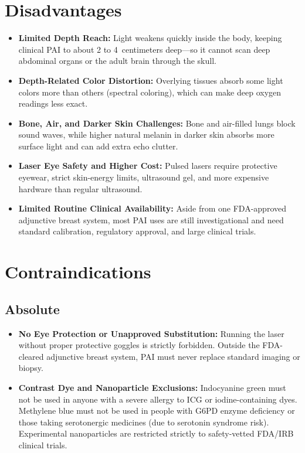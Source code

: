 \section{Disadvantages}
\begin{itemize}
  \item \textbf{Limited Depth Reach:} Light weakens quickly inside the body, keeping clinical PAI to about 2 to 4~centimeters deep---so it cannot scan deep abdominal organs or the adult brain through the skull.
  \item \textbf{Depth-Related Color Distortion:} Overlying tissues absorb some light colors more than others (spectral coloring), which can make deep oxygen readings less exact.
  \item \textbf{Bone, Air, and Darker Skin Challenges:} Bone and air-filled lungs block sound waves, while higher natural melanin in darker skin absorbs more surface light and can add extra echo clutter.
  \item \textbf{Laser Eye Safety and Higher Cost:} Pulsed lasers require protective eyewear, strict skin-energy limits, ultrasound gel, and more expensive hardware than regular ultrasound.
  \item \textbf{Limited Routine Clinical Availability:} Aside from one FDA-approved adjunctive breast system, most PAI uses are still investigational and need standard calibration, regulatory approval, and large clinical trials.
\end{itemize}

\section{Contraindications}

\subsection{Absolute}
\begin{itemize}
  \item \textbf{No Eye Protection or Unapproved Substitution:} Running the laser without proper protective goggles is strictly forbidden. Outside the FDA-cleared adjunctive breast system, PAI must never replace standard imaging or biopsy.
  \item \textbf{Contrast Dye and Nanoparticle Exclusions:} Indocyanine green must not be used in anyone with a severe allergy to ICG or iodine-containing dyes. Methylene blue must not be used in people with G6PD enzyme deficiency or those taking serotonergic medicines (due to serotonin syndrome risk). Experimental nanoparticles are restricted strictly to safety-vetted FDA/IRB clinical trials.
\end{itemize}

